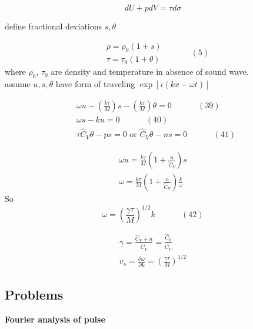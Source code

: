 \documentclass[twoside]{amsart}
\theoremstyle{plain}
\theoremstyle{definition}
\newcommand{\problemhead}[1]
  {
   \noindent{\small\bf Problem #1.}
   }
\begin{document}
\begin{equation}
dU + p dV = \tau d\sigma
\end{equation}

define fractional deviations $s,\theta$

\begin{equation}
  \begin{aligned}
    & \rho = \rho_0(1+s) \\
    & \tau = \tau_0 (1 + \theta) 
\end{aligned} \quad \quad \quad \, (5)
\end{equation}
where $\rho_0$, $\tau_0$ are density and temperature in absence of sound wave. \\
assume $u,s,\theta$ have form of traveling $\exp{ [ i (kx - \omega t)]}$

\begin{align}
& \omega u - \left( \frac{k \tau}{M} \right) s - \left( \frac{ k \tau }{M} \right) \theta =0  \quad \quad \quad \, (39) \\ 
& \omega s - ku =0 \quad \quad \quad \, (40) \\ 
& \tau \widehat{C}_V \theta - ps = 0 \text{ or } \widehat{C}_V \theta - ns = 0 \quad \quad \quad \, (41)
\end{align}

\[
\begin{gathered}
  \omega u = \frac{k\tau}{ M} \left( 1 + \frac{n}{ \widehat{C}_V} \right) s \\ 
  \omega = \frac{k\tau}{M} \left( 1 + \frac{n}{ \widehat{C}_V} \right) \frac{k}{\omega}
\end{gathered}
\]
So 
\begin{equation}
  \omega = \left( \frac{ \gamma \tau}{M} \right)^{1/2} k  \quad \quad \quad \, (42)
\end{equation}

\[
\begin{gathered}
  \gamma = \frac{ \widehat{C}_V + n }{ \widehat{C}_V } = \frac{\widehat{C}_p}{ \widehat{C}_V } \\ 
 v_s = \frac{ \partial \omega}{ \partial k} = \left( \frac{\gamma \tau}{ M} \right)^{1/2}
\end{gathered}
\]

\subsection*{Problems}

\problemhead{1} \textbf{Fourier analysis of pulse}
\end{document}
